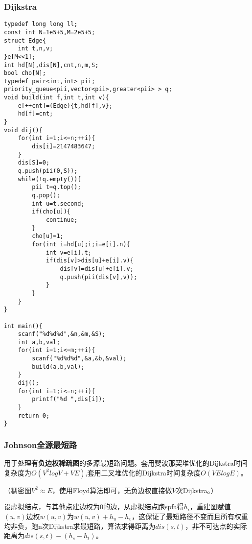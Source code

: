 \documentclass[UTF8]{ctexart}
\begin{document}
\subsubsection{Dijkstra}
\begin{lstlisting}
typedef long long ll;
const int N=1e5+5,M=2e5+5;
struct Edge{
    int t,n,v;
}e[M<<1];
int hd[N],dis[N],cnt,n,m,S;
bool cho[N];
typedef pair<int,int> pii;
priority_queue<pii,vector<pii>,greater<pii> > q;
void build(int f,int t,int v){
    e[++cnt]=(Edge){t,hd[f],v};
    hd[f]=cnt;
}
void dij(){
    for(int i=1;i<=n;++i){
        dis[i]=2147483647;
    }
    dis[S]=0;
    q.push(pii(0,S));
    while(!q.empty()){
        pii t=q.top();
        q.pop();
        int u=t.second;
        if(cho[u]){
            continue;
        }
        cho[u]=1;
        for(int i=hd[u];i;i=e[i].n){
            int v=e[i].t;
            if(dis[v]>dis[u]+e[i].v){
                dis[v]=dis[u]+e[i].v;
                q.push(pii(dis[v],v));
            }
        }
    }
}

int main(){
    scanf("%d%d%d",&n,&m,&S);
    int a,b,val;
    for(int i=1;i<=m;++i){
        scanf("%d%d%d",&a,&b,&val);
        build(a,b,val);
    }
    dij();
    for(int i=1;i<=n;++i){
        printf("%d ",dis[i]);
    }
    return 0;
}
\end{lstlisting}
\subsubsection{Johnson全源最短路}

用于处理\textbf{有负边权稀疏图}的多源最短路问题。套用斐波那契堆优化的Dijkstra时间复杂度为$O(V^2logV+VE)$,套用二叉堆优化的Dijkstra时间复杂度$O(VElogE)$。

（稠密图$V^2\approx E$，使用Floyd算法即可，无负边权直接做$V$次Dijkstra。）

设虚拟结点，与其他点建边权为0的边，从虚拟结点跑spfa得$h_i$，重建图赋值$(u, v)$边权$w(u, v)$为$w(u, v)+h_u-h_v$，这保证了最短路径不变而且所有权重均非负，跑n次Dijkstra求最短路，算法求得距离为$dis(s, t)$，非不可达点的实际距离为$dis(s, t)-(h_s-h_t)$。
\end{document}
